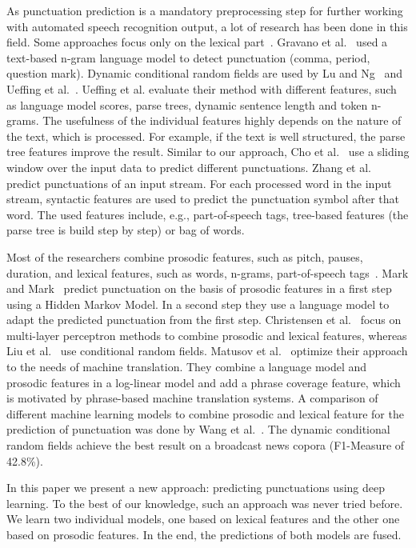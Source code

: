 As punctuation prediction is a mandatory preprocessing step for further working with automated speech recognition output, a lot of research has been done in this field.
Some approaches focus only on the lexical part~\cite{Gravano2009, Lu2010, Ueffing2013, Cho2012, Zhang2013}.
Gravano et al.~\cite{Gravano2009} used a text-based n-gram language model to detect punctuation (comma, period, question mark).
Dynamic conditional random fields are used by Lu and Ng~\cite{Lu2010} and Ueffing et al.~\cite{Ueffing2013}.
Ueffing et al. evaluate their method with different features, such as language model scores, parse trees, dynamic sentence length and token n-grams.
The usefulness of the individual features highly depends on the nature of the text, which is processed.
For example, if the text is well structured, the parse tree features improve the result.
Similar to our approach, Cho et al.~\cite{Cho2012} use a sliding window over the input data to predict different punctuations.
Zhang et al.~\cite{Zhang2013} predict punctuations of an input stream.
For each processed word in the input stream, syntactic features are used to predict the punctuation symbol after that word.
The used features include, e.g., part-of-speech tags, tree-based features (the parse tree is build step by step) or bag of words.

Most of the researchers combine prosodic features, such as pitch, pauses, duration, and lexical features, such as words, n-grams, part-of-speech tags~\cite{Mark1999, Christensen2001, Liu2005, Matusov2007, Wang2012}.
Mark and Mark~\cite{Mark1999} predict punctuation on the basis of prosodic features in a first step using a Hidden Markov Model.
In a second step they use a language model to adapt the predicted punctuation from the first step.
Christensen et al.~\cite{Christensen2001} focus on multi-layer perceptron methods to combine prosodic and lexical features, whereas Liu et al.~\cite{Liu2005} use conditional random fields.
Matusov et al.~\cite{Matusov2007} optimize their approach to the needs of machine translation.
They combine a language model and prosodic features in a log-linear model and add a phrase coverage feature, which is motivated by phrase-based machine translation systems.
A comparison of different machine learning models to combine prosodic and lexical feature for the prediction of punctuation was done by Wang et al.~\cite{Wang2012}.
The dynamic conditional random fields achieve the best result on a broadcast news copora (F1-Measure of 42.8\%).

In this paper we present a new approach: predicting punctuations using deep learning.
To the best of our knowledge, such an approach was never tried before.
We learn two individual models, one based on lexical features and the other one based on prosodic features.
In the end, the predictions of both models are fused.
